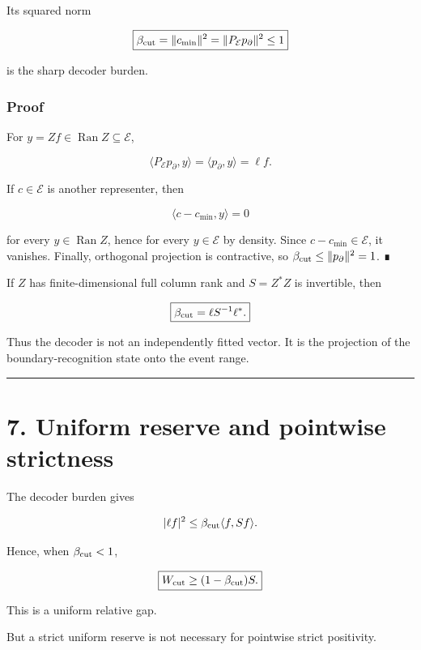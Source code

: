 Its squared norm

\[
\boxed{
\beta_{\rm cut}
=\|c_{\min}\|^2
=\|P_{\mathcal E}p_\partial\|^2
\le1
}
\]

is the sharp decoder burden.

\hypertarget{proof-1}{%
\subsubsection{Proof}\label{proof-1}}

For \(y=Zf\in\operatorname{Ran}Z\subseteq\mathcal E\),

\[
\langle P_{\mathcal E}p_\partial,y\rangle
=\langle p_\partial,y\rangle
=\ell f.
\]

If \(c\in\mathcal E\) is another representer, then

\[
\langle c-c_{\min},y\rangle=0
\]

for every \(y\in\operatorname{Ran}Z\), hence for every \(y\in\mathcal E\) by
density. Since \(c-c_{\min}\in\mathcal E\), it vanishes. Finally, orthogonal
projection is contractive, so \(\beta_{\rm cut}\le\|p_\partial\|^2=1\). ∎

If \(Z\) has finite-dimensional full column rank and \(S=Z^*Z\) is invertible,
then

\[
\boxed{
\beta_{\rm cut}
=\ell S^{-1}\ell^*.
}
\]

Thus the decoder is not an independently fitted vector. It is the projection
of the boundary-recognition state onto the event range.

\begin{center}\rule{0.5\linewidth}{0.5pt}\end{center}

\hypertarget{uniform-reserve-and-pointwise-strictness}{%
\section{7. Uniform reserve and pointwise strictness}\label{uniform-reserve-and-pointwise-strictness}}

The decoder burden gives

\[
|\ell f|^2
\le
\beta_{\rm cut}\langle f,Sf\rangle.
\]

Hence, when \(\beta_{\rm cut}<1\),

\[
\boxed{
W_{\rm cut}
\ge
(1-\beta_{\rm cut})S.
}
\]

This is a uniform relative gap.

But a strict uniform reserve is not necessary for pointwise strict positivity.

